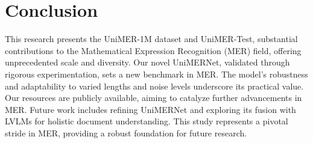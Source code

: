 \documentclass[runningheads]{llncs}
\begin{document}
\section{Conclusion}
This research presents the UniMER-1M dataset and UniMER-Test, substantial contributions to the Mathematical Expression Recognition (MER) field, offering unprecedented scale and diversity. Our novel UniMERNet, validated through rigorous experimentation, sets a new benchmark in MER. The model's robustness and adaptability to varied lengths and noise levels underscore its practical value. Our resources are publicly available, aiming to catalyze further advancements in MER. Future work includes refining UniMERNet and exploring its fusion with LVLMs for holistic document understanding. This study represents a pivotal stride in MER, providing a robust foundation for future research.



\par\vfill\par
\clearpage  %


%
%


\end{document}
